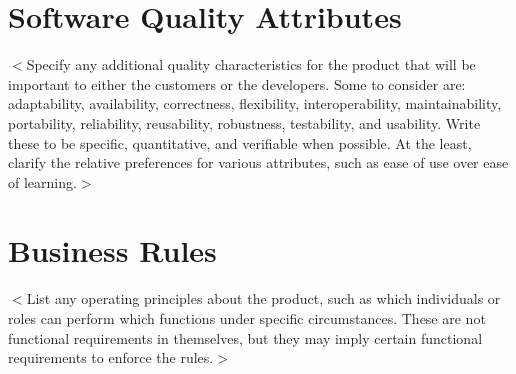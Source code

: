 \section{Software Quality Attributes}
$<$Specify any additional quality characteristics for the product that will be
important to either the customers or the developers. Some to consider are:
adaptability, availability, correctness, flexibility, interoperability,
maintainability, portability, reliability, reusability, robustness, testability,
and usability. Write these to be specific, quantitative, and verifiable when
possible. At the least, clarify the relative preferences for various attributes,
such as ease of use over ease of learning.$>$

\section{Business Rules}
$<$List any operating principles about the product, such as which individuals or
roles can perform which functions under specific circumstances. These are not
functional requirements in themselves, but they may imply certain functional
requirements to enforce the rules.$>$
